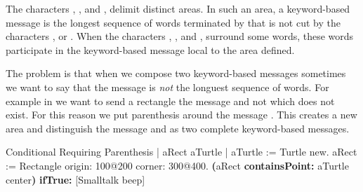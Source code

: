 \begin{largecadre}{
The characters \ct{[}, \ct{]}, and \ct{(}, \ct{)} delimit distinct areas. In such an area, 
a keyword-based message is the longest sequence  of words terminated by \ct{:} that is not cut by the characters ,  or \ct{;}. 
When the characters \ct{[}, \ct{]}, and \ct{(}, \ct{)} surround some words, these words participate in the keyword-based message local to the area defined.}
\end{largecadre}


The problem is that when we compose two keyword-based messages sometimes we want to say
that the message is \textit{not} the longuest sequence of words. For example in   we want to send a rectangle the message  and not  which does not exist. For this reason we put parenthesis around the message . This creates a new area and distinguish the message  and  as two complete keyword-based messages. 

\begin{scriptwithtitle}{Conditional Requiring Parenthesis}\label{scr:withParenthesis2}
| aRect aTurtle |
aTurtle := Turtle new.
aRect := Rectangle origin: 100@200 corner: 300@400.
\textbf{(}aRect \textbf{containsPoint:} aTurtle center\textbf{)}
    \textbf{ifTrue:} [Smalltalk beep]
\end{scriptwithtitle}







